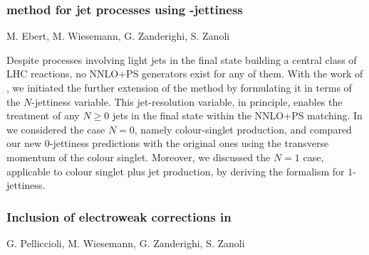 \documentclass{FBR_Bericht_2025}
\begin{document}
\begin{refsection}
\subsubsection[\minnlo{} method for jet processes using $N$-jettiness]{\minnlo{} method for jet processes using -jettiness}
\begin{Namen}
M. Ebert, M. Wiesemann, G. Zanderighi, S. Zanoli
\end{Namen}
Despite processes involving light jets in the final state building a 
central class of LHC reactions, no NNLO+PS generators exist for any of them.
With the work of \citere{}, we initiated the further extension of the \minnlo{} method by
formulating it in terms of the $N$-jettiness variable. This jet-resolution variable,
in principle, enables the treatment of any $N\ge 0$ jets in the final state within the 
NNLO+PS matching. In \citere{} we considered the case $N=0$, namely colour-singlet
production, and compared our new $0$-jettiness predictions with the original \minnlo{}
ones using the transverse momentum of the colour singlet.
Moreover, we discussed the $N=1$ case, applicable to colour singlet
plus jet production, by deriving the \minnlo{} formalism for $1$-jettiness.
%
\subsubsection{Inclusion of electroweak corrections in \minnlo{}}
\begin{Namen}
G. Pelliccioli, M. Wiesemann, G. Zanderighi, S. Zanoli
\end{Namen}


\end{refsection}
\end{document}
